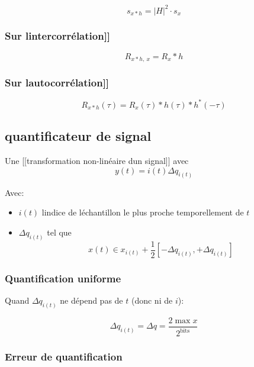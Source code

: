\documentclass[
]{article}
\providecommand{\tightlist}{%
  \setlength{\itemsep}{0pt}\setlength{\parskip}{0pt}}
\begin{document}
\[
s_{x * h} = |H|^2 \cdot s_x
\]

\hypertarget{sur-lintercorruxe9lation}{%
\subsubsection{Sur
l\textquotesingle{[}{[}intercorrélation{]}{]}}\label{sur-lintercorruxe9lation}}

\[
R_{x\ast h,\ x} = R_x \ast h
\]

\hypertarget{sur-lautocorruxe9lation}{%
\subsubsection{Sur
l\textquotesingle{[}{[}autocorrélation{]}{]}}\label{sur-lautocorruxe9lation}}

\[
R_{x\ast h}(\tau) = R_x(\tau) \ast h(\tau) \ast h^\ast(-\tau)
\]

\hypertarget{quantificateur-de-signal}{%
\subsection{quantificateur de signal}\label{quantificateur-de-signal}}

Une {[}{[}transformation non-linéaire d\textquotesingle un signal{]}{]}
avec \[
y(t) = i(t) \Delta q_{i(t)}
\]

Avec:

\begin{itemize}
\tightlist
\item
  \(i(t)\) l\textquotesingle indice de l\textquotesingle échantillon le
  plus proche temporellement de \(t\)
\item
  \(\Delta q_{i(t)}\) tel que \[
  x(t) \in x_{i(t)} + \frac{1}{2} \left[ -\Delta q_{i(t)}, +\Delta q_{i(t)} \right]
  \]
\end{itemize}

\hypertarget{quantification-uniforme}{%
\subsubsection{Quantification uniforme}\label{quantification-uniforme}}

Quand \(\Delta q_{i(t)}\) ne dépend pas de \(t\) (donc ni de \(i\)):

\[
\Delta q_{i(t)} = \Delta q =  \frac{2 \max x}{2^\text{bits}}
\]

\hypertarget{erreur-de-quantification}{%
\subsubsection{Erreur de
quantification}\label{erreur-de-quantification}}
\end{document}

